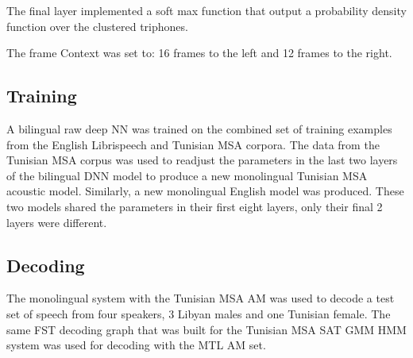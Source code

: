 The final layer implemented  a soft max function that output a probability density function over the clustered triphones.

The frame Context was set to: 16 frames to the left and 12 frames to the right.

\subsection{Training}
\label{sec:train}


A bilingual raw deep \gls{NN}  was trained on the combined set of training examples from the English Librispeech and Tunisian \gls{MSA}  corpora.
The data from the Tunisian \gls{MSA} corpus was used to readjust the parameters in the last two layers of the bilingual \gls{DNN} model to produce a new monolingual Tunisian \gls{MSA}  acoustic model. 
Similarly, a new monolingual English model was produced.
These two models shared the parameters in their first eight layers, only their final 2 layers were different.

\subsection{Decoding}
\label{sec:decode}


The monolingual system with the Tunisian \gls{MSA} \gls{AM} was used to decode a test set of speech from four speakers, 3 Libyan males and one Tunisian female.
The same \gls{FST} decoding graph that was built for the Tunisian \gls{MSA} \gls{SAT} \gls{GMM} \gls{HMM} system was used for decoding with the \gls{MTL} \gls{AM} set.
